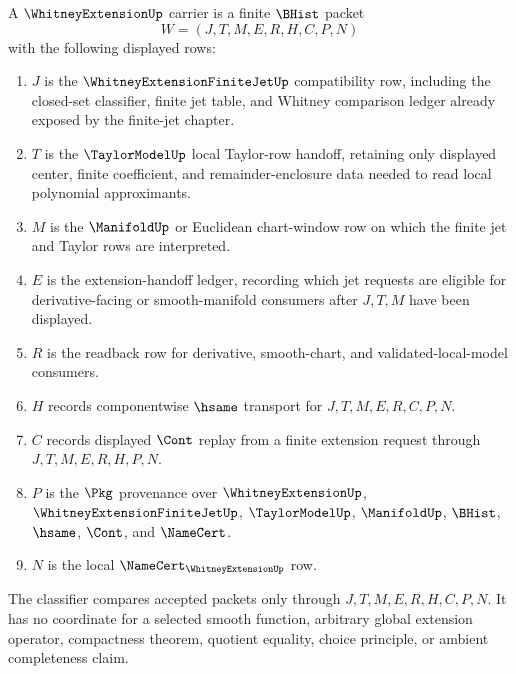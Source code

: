 \begin{definition}
\label{def:whitney-extension-carrier}
A $\WhitneyExtensionUp$ carrier is a finite $\BHist$ packet
$$
W=(J,T,M,E,R,H,C,P,N)
$$
with the following displayed rows:
\begin{enumerate}
\item $J$ is the $\WhitneyExtensionFiniteJetUp$ compatibility row, including the closed-set classifier, finite jet table, and Whitney comparison ledger already exposed by the finite-jet chapter.
\item $T$ is the $\TaylorModelUp$ local Taylor-row handoff, retaining only displayed center, finite coefficient, and remainder-enclosure data needed to read local polynomial approximants.
\item $M$ is the $\ManifoldUp$ or Euclidean chart-window row on which the finite jet and Taylor rows are interpreted.
\item $E$ is the extension-handoff ledger, recording which jet requests are eligible for derivative-facing or smooth-manifold consumers after $J,T,M$ have been displayed.
\item $R$ is the readback row for derivative, smooth-chart, and validated-local-model consumers.
\item $H$ records componentwise $\hsame$ transport for $J,T,M,E,R,C,P,N$.
\item $C$ records displayed $\Cont$ replay from a finite extension request through $J,T,M,E,R,H,P,N$.
\item $P$ is the $\Pkg$ provenance over $\WhitneyExtensionUp$, $\WhitneyExtensionFiniteJetUp$, $\TaylorModelUp$, $\ManifoldUp$, $\BHist$, $\hsame$, $\Cont$, and $\NameCert$.
\item $N$ is the local $\NameCert_{\WhitneyExtensionUp}$ row.
\end{enumerate}
The classifier compares accepted packets only through $J,T,M,E,R,H,C,P,N$. It has no coordinate for a selected smooth function, arbitrary global extension operator, compactness theorem, quotient equality, choice principle, or ambient completeness claim.
\end{definition}

